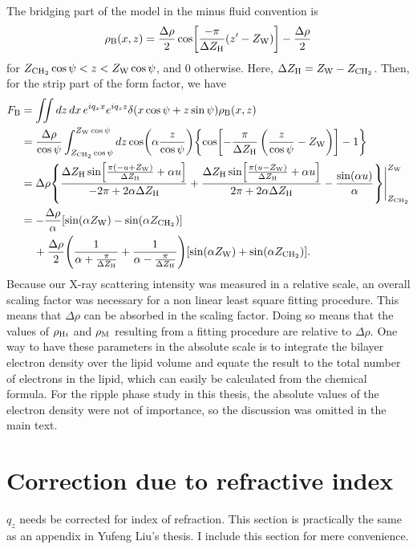 The bridging part of the model in the minus fluid convention is 
\begin{align}
  \rho_\mathrm{B}(x,z) = \frac{\Delta\rho}{2} \cos \mathopen{}\left[ 
    \frac{-\pi}{\Delta Z_\mathrm{H}}(z'-Z_\mathrm{W}) \right]\mathclose{} - \frac{\Delta\rho}{2}
\end{align}
for $Z_\mathrm{CH_2}\cos\psi < z < Z_\mathrm{W}\cos\psi$, and 0 otherwise. Here,
$\Delta Z_\mathrm{H}=Z_\mathrm{W}-Z_\mathrm{CH_2}$.
Then, for the strip part of the form factor, we have
\begin{align}
  F_\mathrm{B} 
  &= \iint\mathop{dz}\mathop{dx} e^{iq_xx}e^{iq_zz} \delta(x\cos\psi+z\sin\psi) \rho_\mathrm{B}(x,z) \nonumber\\
  &= \frac{\Delta\rho}{\cos\psi}
     \int_{Z_\mathrm{CH_2}\cos\psi}^{Z_\mathrm{W}\cos\psi}\mathop{dz} \cos\mathopen{}\left( \alpha\frac{z}{\cos\psi} \right)\mathclose{} 
     \mathopen{}\left\lbrace \cos\mathopen{}\left[ -\frac{\pi}{\Delta Z_\mathrm{H}}\left(\frac{z}{\cos\psi}-Z_\mathrm{W}\right) \right]\mathclose{} - 1 \right\rbrace\mathclose{} \nonumber\\
  &= \Delta\rho \mathopen{}\left\lbrace 
       \frac{\Delta Z_\mathrm{H}\sin\mathopen{}\left[ \frac{\pi(-u+Z_\mathrm{W})}{\Delta Z_\mathrm{H}}+\alpha u \right]\mathclose{}}{-2\pi+2\alpha\Delta Z_\mathrm{H}}
       + \frac{\Delta Z_\mathrm{H}\sin\mathopen{}\left[ \frac{\pi(u-Z_\mathrm{W})}{\Delta Z_\mathrm{H}}+\alpha u \right]\mathclose{}}{2\pi+2\alpha\Delta Z_\mathrm{H}}
       - \frac{\sin(\alpha u)}{\alpha}  
      \right\rbrace\mathclose{}\Bigg|_{Z_\mathrm{CH_2}}^{Z_\mathrm{W}} \nonumber\\
  &= -\frac{\Delta\rho}{\alpha}\mathopen{}\left[ \sin(\alpha Z_\mathrm{W})-\sin(\alpha Z_\mathrm{CH_2}) \right]\mathclose{} \nonumber\\
  & \,\quad + \frac{\Delta\rho}{2} \mathopen{}\left( 
      \frac{1}{\alpha+\frac{\pi}{\Delta Z_\mathrm{H}}} 
      + \frac{1}{\alpha-\frac{\pi}{\Delta Z_\mathrm{H}}}
     \right)\mathclose{}\mathopen{}\left[ \sin(\alpha Z_\mathrm{W})+\sin(\alpha Z_\mathrm{CH_2}) \right]\mathclose{}.
\end{align}
Because our X-ray scattering intensity was measured in a relative scale, 
an overall scaling factor was necessary for a non linear least square 
fitting procedure. This means that $\Delta\rho$ can be absorbed in the 
scaling factor. Doing so means that the values of $\rho_{\mathrm{H}i}$ and $\rho_\mathrm{M}$
resulting from a fitting procedure are relative to $\Delta\rho$. One way 
to have these parameters in the absolute scale is to integrate the 
bilayer electron density over the lipid volume and equate the result
to the total number of electrons in the lipid, which can easily be calculated
from the chemical formula. For the ripple phase study in this thesis, the
absolute values of the electron density were not of importance, so the
discussion was omitted in the main text.

\section{Correction due to refractive index}
$q_z$ needs be corrected for index of refraction. This section is practically
the same as an appendix in Yufeng Liu's thesis. I include this section for
mere convenience.

